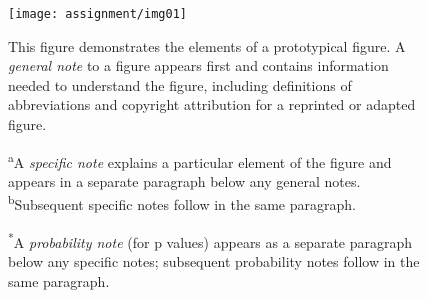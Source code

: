 \begin{figure}[!htb]

  \label{fig:a1}


  \texttt{[image: assignment/img01]} %

  \noteheader This figure demonstrates the elements of a
  prototypical figure. A \textit{general note} to a figure appears first
  and contains information needed to understand the figure, including
  definitions of abbreviations and copyright attribution for a reprinted
  or adapted figure.

  \textsuperscript{a}A \textit{specific note} explains a
  particular element of the figure and appears in a separate paragraph
  below any general notes. \textsuperscript{b}Subsequent specific
  notes follow in the same paragraph.

  \textsuperscript{*}A \textit{probability note} (for p values) appears
  as a separate paragraph below any specific notes; subsequent probability
  notes follow in the same paragraph.
\end{figure}
